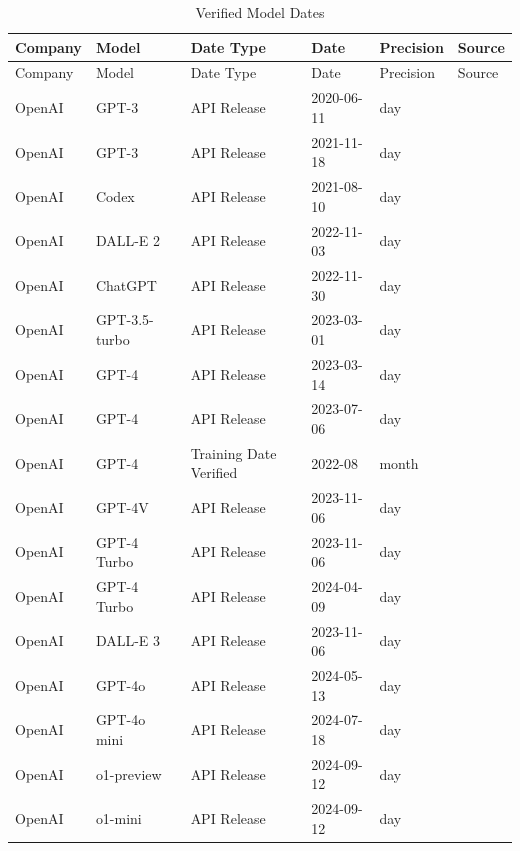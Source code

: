 \documentclass[a4paper,fleqn,longmktitle]{cas-sc}
\begin{document}
\begin{longtable}{p{2.2cm} p{3.4cm} p{3.0cm} p{2.3cm} p{1.6cm} p{2.0cm}}
\caption{Verified Model Dates}
\label{tab:verified_model_dates}\\
\toprule
Company & Model & Date Type & Date & Precision & Source \\
\midrule
\endfirsthead

\toprule
Company & Model & Date Type & Date & Precision & Source \\
\midrule
\endhead

\bottomrule
\endfoot

OpenAI & GPT-3 & API Release & 2020-06-11 & day & \cite{openai_api_2020} \\
OpenAI & GPT-3 & API Release & 2021-11-18 & day & \cite{openai_api_nowaitlist_2021} \\
OpenAI & Codex & API Release & 2021-08-10 & day & \cite{openai_codex_2021} \\
OpenAI & DALL-E 2 & API Release & 2022-11-03 & day & \cite{openai_dalle_api_beta_2022} \\
OpenAI & ChatGPT & API Release & 2022-11-30 & day & \cite{openai_chatgpt_2022} \\
OpenAI & GPT-3.5-turbo & API Release & 2023-03-01 & day & \cite{openai_chatgpt_whisper_apis_2023} \\
OpenAI & GPT-4 & API Release & 2023-03-14 & day & \cite{openai_gpt4_2023} \\
OpenAI & GPT-4 & API Release & 2023-07-06 & day & \cite{openai_gpt4_api_ga_2023} \\
OpenAI & GPT-4 & Training Date Verified & 2022-08 & month & \cite{openai_gpt4_system_card_2023} \\
OpenAI & GPT-4V & API Release & 2023-11-06 & day & \cite{openai_devday_2023} \\
OpenAI & GPT-4 Turbo & API Release & 2023-11-06 & day & \cite{openai_devday_2023} \\
OpenAI & GPT-4 Turbo & API Release & 2024-04-09 & day & \cite{openai_embeddings_api_updates_2024} \\
OpenAI & DALL-E 3 & API Release & 2023-11-06 & day & \cite{openai_devday_2023} \\
OpenAI & GPT-4o & API Release & 2024-05-13 & day & \cite{openai_hello_gpt4o_2024} \\
OpenAI & GPT-4o mini & API Release & 2024-07-18 & day & \cite{openai_gpt4o_mini_2024} \\
OpenAI & o1-preview & API Release & 2024-09-12 & day & \cite{openai_o1_preview_2024} \\
OpenAI & o1-mini & API Release & 2024-09-12 & day & \cite{openai_o1_preview_2024} \\


\end{longtable}
\end{document}
